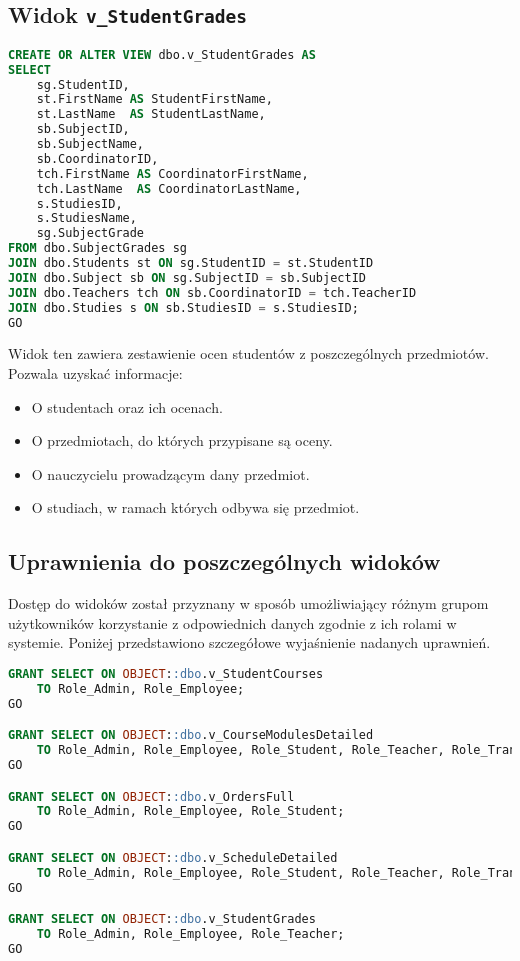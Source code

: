 \documentclass[12pt]{article}
\begin{document}
\newpage
\subsection{Widok \texttt{v\_StudentGrades}}

\begin{lstlisting}[language=SQL]
CREATE OR ALTER VIEW dbo.v_StudentGrades AS
SELECT
    sg.StudentID,
    st.FirstName AS StudentFirstName,
    st.LastName  AS StudentLastName,
    sb.SubjectID,
    sb.SubjectName,
    sb.CoordinatorID,
    tch.FirstName AS CoordinatorFirstName,
    tch.LastName  AS CoordinatorLastName,
    s.StudiesID,
    s.StudiesName,
    sg.SubjectGrade
FROM dbo.SubjectGrades sg
JOIN dbo.Students st ON sg.StudentID = st.StudentID
JOIN dbo.Subject sb ON sg.SubjectID = sb.SubjectID
JOIN dbo.Teachers tch ON sb.CoordinatorID = tch.TeacherID
JOIN dbo.Studies s ON sb.StudiesID = s.StudiesID;
GO
\end{lstlisting}

\noindent Widok ten zawiera zestawienie ocen studentów z poszczególnych przedmiotów. Pozwala uzyskać informacje:
\begin{itemize}
    \item O studentach oraz ich ocenach.
    \item O przedmiotach, do których przypisane są oceny.
    \item O nauczycielu prowadzącym dany przedmiot.
    \item O studiach, w ramach których odbywa się przedmiot.
\end{itemize}

\subsection{Uprawnienia do poszczególnych widoków}

\noindent Dostęp do widoków został przyznany w sposób umożliwiający różnym grupom użytkowników korzystanie z odpowiednich danych zgodnie z ich rolami w systemie.  
Poniżej przedstawiono szczegółowe wyjaśnienie nadanych uprawnień.

\begin{lstlisting}[language=SQL]
GRANT SELECT ON OBJECT::dbo.v_StudentCourses 
    TO Role_Admin, Role_Employee;
GO

GRANT SELECT ON OBJECT::dbo.v_CourseModulesDetailed
    TO Role_Admin, Role_Employee, Role_Student, Role_Teacher, Role_Translator;
GO

GRANT SELECT ON OBJECT::dbo.v_OrdersFull
    TO Role_Admin, Role_Employee, Role_Student;
GO

GRANT SELECT ON OBJECT::dbo.v_ScheduleDetailed
    TO Role_Admin, Role_Employee, Role_Student, Role_Teacher, Role_Translator;
GO

GRANT SELECT ON OBJECT::dbo.v_StudentGrades
    TO Role_Admin, Role_Employee, Role_Teacher;
GO
\end{lstlisting}
\end{document}
